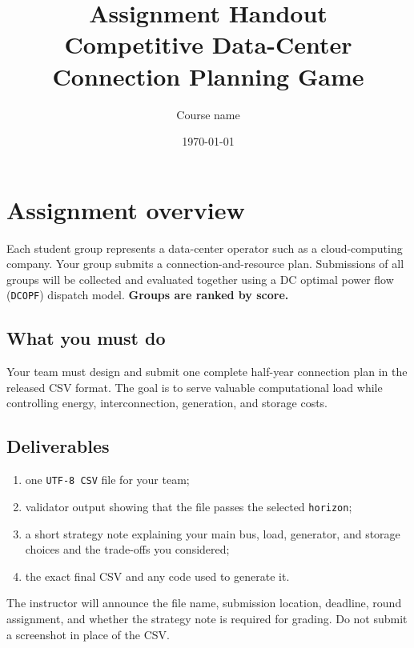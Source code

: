 \documentclass[12pt]{article}
\title{\textbf{Assignment Handout}\\[0.4em]
  \large Competitive Data-Center Connection Planning Game}
\author{Course name}
\date{\today}
\newcommand{\code}[1]{\texttt{#1}}
\begin{document}
\maketitle

\begin{center}
\end{center}

\tableofcontents
\newpage

\section{Assignment overview}

Each student group represents a data-center operator such as a cloud-computing
company. Your group submits a connection-and-resource plan. Submissions of
all groups will be collected and evaluated together using a DC optimal power
flow (\code{DCOPF}) dispatch model. \textbf{Groups are ranked by score.}

\subsection{What you must do}
Your team must design and submit one complete half-year connection plan in the
released CSV format. The goal is to serve valuable computational load while
controlling energy, interconnection, generation, and storage costs.

\subsection{Deliverables}
\begin{enumerate}[leftmargin=*]
  \item one \code{UTF-8 CSV} file for your team;
  \item validator output showing that the file passes the selected \code{horizon};
  \item a short strategy note explaining your main bus, load, generator, and
  storage choices and the trade-offs you considered;
  \item the exact final CSV and any code used to generate it.
\end{enumerate}
The instructor will announce the file name, submission location, deadline,
round assignment, and whether the strategy note is required for grading. Do
not submit a screenshot in place of the CSV.
\end{document}
